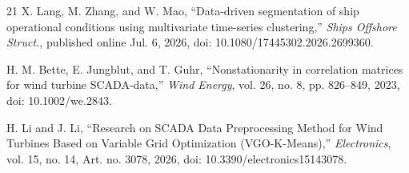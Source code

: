 \documentclass[conference]{IEEEtran}
\begin{document}
\begin{thebibliography}{21}
X. Lang, M. Zhang, and W. Mao, ``Data-driven segmentation of ship operational conditions using multivariate time-series clustering,'' \textit{Ships Offshore Struct.}, published online Jul. 6, 2026, doi: 10.1080/17445302.2026.2699360.

H. M. Bette, E. Jungblut, and T. Guhr, ``Nonstationarity in correlation matrices for wind turbine SCADA-data,'' \textit{Wind Energy}, vol. 26, no. 8, pp. 826--849, 2023, doi: 10.1002/we.2843.

H. Li and J. Li, ``Research on SCADA Data Preprocessing Method for Wind Turbines Based on Variable Grid Optimization (VGO-K-Means),'' \textit{Electronics}, vol. 15, no. 14, Art. no. 3078, 2026, doi: 10.3390/electronics15143078.

\end{thebibliography}
\end{document}
